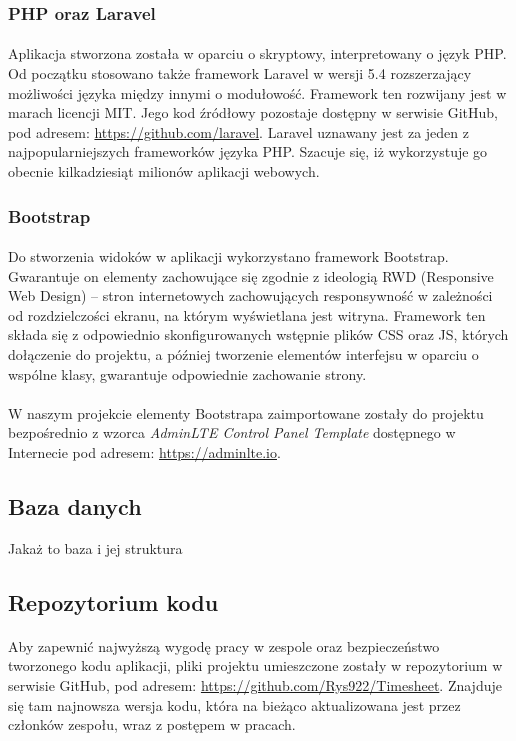 \documentclass[a4paper, 12pt, oneside]{article}
\begin{document}
			\subsubsection{PHP oraz Laravel}
				\paragraph{} Aplikacja stworzona została w oparciu o skryptowy, interpretowany o język PHP. Od początku stosowano także framework Laravel w wersji 5.4 rozszerzający możliwości języka między innymi o modułowość. Framework ten rozwijany jest w marach licencji MIT. Jego kod źródłowy pozostaje dostępny w serwisie GitHub, pod adresem: \url{https://github.com/laravel}. Laravel uznawany jest za jeden z najpopularniejszych frameworków języka PHP. Szacuje się, iż wykorzystuje go obecnie kilkadziesiąt milionów aplikacji webowych.
			\subsubsection{Bootstrap}
				\paragraph{} Do stworzenia widoków w aplikacji wykorzystano framework Bootstrap. Gwarantuje on elementy zachowujące się zgodnie z ideologią RWD (Responsive Web Design) -- stron internetowych zachowujących responsywność w zależności od rozdzielczości ekranu, na którym wyświetlana jest witryna. Framework ten składa się z odpowiednio skonfigurowanych wstępnie plików CSS oraz JS, których dołączenie do projektu, a później tworzenie elementów interfejsu w oparciu o wspólne klasy, gwarantuje odpowiednie zachowanie strony.
				\paragraph{} W naszym projekcie elementy Bootstrapa zaimportowane zostały do projektu bezpośrednio z wzorca \textit{AdminLTE Control Panel Template} dostępnego w Internecie pod adresem: \url{https://adminlte.io}.  
				
		\subsection{Baza danych}
			Jakaż to baza i jej struktura
		\subsection{Repozytorium kodu}
			\paragraph{}Aby zapewnić najwyższą wygodę pracy w zespole oraz bezpieczeństwo tworzonego kodu aplikacji, pliki projektu umieszczone zostały w repozytorium w serwisie GitHub, pod adresem:  \url{https://github.com/Rys922/Timesheet}. Znajduje się tam najnowsza wersja kodu, która na bieżąco aktualizowana jest przez członków zespołu, wraz z postępem w pracach.
\end{document}
